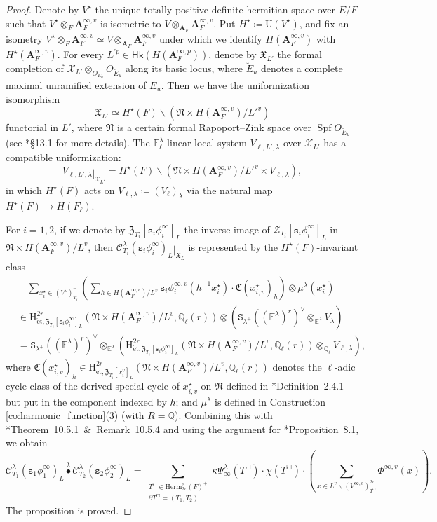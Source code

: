 \documentclass[12pt]{amsart}
\numberwithin{equation}{section}
\theoremstyle{plain}
\theoremstyle{definition}
\theoremstyle{remark}
\renewcommand{\b}[1]{\mathbf{#1}}
\renewcommand{\c}[1]{\mathcal{#1}}
\renewcommand{\d}[1]{\mathbb{#1}}
\newcommand{\f}[1]{\mathfrak{#1}}
\renewcommand{\r}[1]{\mathrm{#1}}
\renewcommand{\sf}[1]{\mathsf{#1}}
\renewcommand{\(}{\left(}
\renewcommand{\)}{\right)}
\newcommand{\res}{\mathbin{|}}
\newcommand{\bA}{\b A}
\newcommand{\cC}{\c C}
\newcommand{\cX}{\c X}
\newcommand{\cZ}{\c Z}
\newcommand{\dE}{\d E}
\newcommand{\dQ}{\d Q}
\newcommand{\fC}{\f C}
\newcommand{\fN}{\f N}
\newcommand{\fX}{\f X}
\newcommand{\fZ}{\f Z}
\newcommand{\rH}{\r H}
\newcommand{\rU}{\r U}
\newcommand{\tS}{\mathtt{S}}
\newcommand{\ts}{\mathtt{s}}
\newcommand{\et}{{\acute{\r{e}}\r{t}}}
\newcommand{\Herm}{\r{Herm}}
\newcommand{\Hk}{\sf{Hk}}
\DeclareMathOperator{\Spf}{Spf}
\begin{document}
\begin{proof}
Denote by $V^\star$ the unique totally positive definite hermitian space over $E/F$ such that $V^\star\otimes_F\bA_F^{\infty,v}$ is isometric to $V\otimes_{\bA_F}\bA_F^{\infty,v}$. Put $H^\star\coloneqq\rU(V^\star)$, and fix an isometry $V^\star\otimes_F\bA_F^{\infty,v}\simeq V\otimes_{\bA_F}\bA_F^{\infty,v}$ under which we identify $H(\bA_F^{\infty,v})$ with $H^\star(\bA_F^{\infty,v})$. For every $L^{\prime p}\in\Hk(H(\bA_F^{\infty,p}))$, denote by $\fX_{L'}$ the formal completion of $\cX_{L'}\otimes_{O_{E_u}}O_{\breve{E}_u}$ along its basic locus, where $\breve{E}_u$ denotes a complete maximal unramified extension of $E_u$. Then we have the uniformization isomorphism
\[
\fX_{L'}\simeq H^\star(F)\backslash\(\fN\times H(\bA_F^{\infty,v})/{L'}^v\)
\]
functorial in $L'$, where $\fN$ is a certain formal Rapoport--Zink space over $\Spf O_{\breve{E}_u}$ (see \cite{LZ22}*{\S13.1} for more details). The $\dE^\lambda_\ell$-linear local system $V_{\ell,L',\lambda}$ over $\cX_{L'}$ has a compatible uniformization:
\[
V_{\ell,L',\lambda}\res_{\fX_{L'}}=H^\star(F)\backslash\(\fN\times H(\bA_F^{\infty,v})/{L'}^v\times V_{\ell,\lambda}\),
\]
in which $H^\star(F)$ acts on $V_{\ell,\lambda}\coloneqq(V_\ell)_\lambda$ via the natural map $H^\star(F)\to H(F_\ell)$.

For $i=1,2$, if we denote by $\fZ_{T_i}[\ts_i\phi^\infty_i]_L$ the inverse image of $\cZ_{T_i}[\ts_i\phi^\infty_i]_L$ in $\fN\times H(\bA_F^{\infty,v})/L^v$, then $\cC^\lambda_{T_i}(\ts_i\phi^\infty_i)_L\res_{\fX_L}$ is represented by the $H^\star(F)$-invariant class
\begin{align*}
&\quad\sum_{x^\star_i\in(V^\star)^r_{T_i}}\(\sum_{h\in H(\bA_F^{\infty,v})/L^v}\ts_i\phi^{\infty,v}_i(h^{-1}x^\star_i)\cdot\fC(x^\star_{i,v})_h\)\otimes\mu^\lambda(x^\star_i) \\
&\in\rH^{2r}_{\et,\fZ_{T_i}[\ts_i\phi^\infty_i]_L}(\fN\times H(\bA_F^{\infty,v})/L^v,\dQ_\ell(r))
\otimes\(\tS_{\lambda^+}((\dE^\lambda)^r)^\vee\otimes_{\dE^\lambda}V_\lambda\) \\
&=\tS_{\lambda^+}((\dE^\lambda)^r)^\vee\otimes_{\dE^\lambda}\(\rH^{2r}_{\et,\fZ_{T_i}[\ts_i\phi^\infty_i]_L}(\fN\times H(\bA_F^{\infty,v})/L^v,\dQ_\ell(r))\otimes_{\dQ_\ell}V_{\ell,\lambda}\),
\end{align*}
where $\fC(x^\star_{i,v})_h\in\rH^{2r}_{\et,\fZ_{T_i}[x^v_i]_L}(\fN\times H(\bA_F^{\infty,v})/L^v,\dQ_\ell(r))$ denotes the $\ell$-adic cycle class of the derived special cycle of $x^\star_{i,v}$ on $\fN$ defined in \cite{LZ22}*{Definition~2.4.1}  but put in the component indexed by $h$; and $\mu^\lambda$ is defined in Construction \ref{co:harmonic_function}(3) (with $R=\dQ$). Combining this with \cite{LZ22}*{Theorem~10.5.1~\&~Remark~10.5.4} and using the argument for \cite{LL21}*{Proposition~8.1}, we obtain
\[
\cC^\lambda_{T_1}(\ts_1\phi^\infty_1)_L\overset{\lambda}\bullet\cC^\lambda_{T_2}(\ts_2\phi^\infty_2)_L
=\sum_{\substack{T^\Box\in\Herm_{2r}^\circ(F)^+\\ \partial T^\Box=(T_1,T_2)}}
\kappa\Psi^\lambda_\infty(T^\Box)\cdot\chi(T^\Box)\cdot\(\sum_{x\in L^v\backslash (V^{\infty,v})^{2r}_{T^\Box}}
\Phi^{\infty,v}(x)\).
\]
The proposition is proved.
\end{proof}
\end{document}
